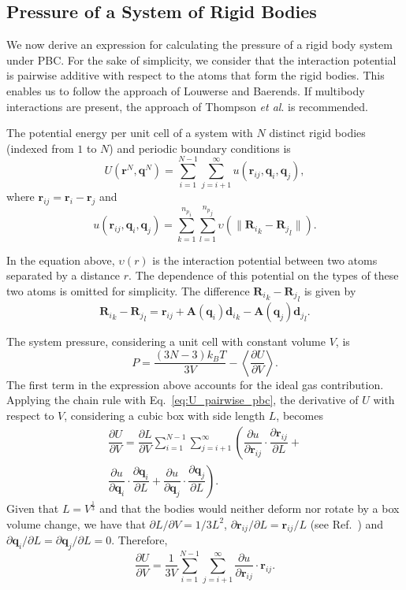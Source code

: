 \documentclass[aip,jcp,reprint,amsmath,amssymb,amsfont]{revtex4-1}
\newcommand{\mt}[1]{\boldsymbol{\mathbf{#1}}}           %
\newcommand{\vt}[1]{\boldsymbol{\mathbf{#1}}}           %
\newcommand{\diff}[2]{\dfrac{\partial #1}{\partial #2}} %
\begin{document}
\subsection{Pressure of a System of Rigid Bodies}
\label{sec:pressure}

We now derive an expression for calculating the pressure of a rigid body system under PBC. For the sake of simplicity, we consider that the interaction potential is pairwise additive with respect to the atoms that form the rigid bodies. This enables us to follow the approach of Louwerse and Baerends.\cite{Louwerse2006} If multibody interactions are present, the approach of Thompson \textit{et al}.\cite{Thompson2009} is recommended.

The potential energy per unit cell of a system with $N$ distinct rigid bodies (indexed from $1$ to $N$) and periodic boundary conditions is
\begin{equation}
\label{eq:U_pairwise_pbc}
U({\vt r}^N, {\vt q}^N) = \sum_{i=1}^{N-1} \sum_{j=i+1}^{\infty} u({\vt r}_{ij},{\vt q}_i,{\vt q}_j),
\end{equation}
where ${\vt r}_{ij} = {\vt r}_i - {\vt r}_j$ and
\begin{equation}
\label{eq:u_rigid_body_pair}
u({\vt r}_{ij},{\vt q}_i,{\vt q}_j) = \sum_{k=1}^{{n_p}_i} \sum_{l=1}^{{n_p}_j} \upsilon \left( \|{{\vt R}_i}_k - {{\vt R}_j}_l\| \right).
\end{equation}

In the equation above, $\upsilon(r)$ is the interaction potential between two atoms separated by a distance $r$. The dependence of this potential on the types of these two atoms is omitted for simplicity. The difference ${{\vt R}_i}_k - {{\vt R}_j}_l$ is given by
\[
{{\vt R}_i}_k - {{\vt R}_j}_l = {\vt r}_{ij} + {\mt A}({\vt q}_i){{\vt d}_i}_k - {\mt A}({\vt q}_j){{\vt d}_j}_l.
\]

The system pressure, considering a unit cell with constant volume $V$, is\cite{Louwerse2006,Tuckerman2010}
\[
P = \frac{(3N-3) k_B T}{3V} - \left\langle \diff{U}{V} \right\rangle.
\]
The first term in the expression above accounts for the ideal gas contribution. Applying the chain rule with Eq.~\ref{eq:U_pairwise_pbc}, the derivative of $U$ with respect to $V$, considering a cubic box with side length $L$, becomes
\begin{equation}
\begin{split}
\diff{U}{V} = \diff{L}{V} \sum_{i=1}^{N-1} \sum_{j=i+1}^{\infty} \left( \diff{u}{{\vt r}_{ij}} \cdot \diff{{\vt r}_{ij}}{L} + \right. \\ \left. \diff{u}{{\vt q}_i} \cdot \diff{{\vt q}_i}{L} + \diff{u}{{\vt q}_j} \cdot \diff{{\vt q}_j}{L}\right).
\end{split}
\end{equation}
Given that $L = V^\frac{1}{3}$ and that the bodies would neither deform nor rotate by a box volume change, we have that $\partial L / \partial V = 1/3L^2$, $\partial {\vt r}_{ij}/\partial L = {\vt r}_{ij}/L$ (see Ref.~) and $\partial {\vt q}_i / \partial L = \partial {\vt q}_j / \partial L = 0$. Therefore,
\[
\diff{U}{V} = \frac{1}{3V} \sum_{i=1}^{N-1} \sum_{j=i+1}^{\infty} \diff{u}{{\vt r}_{ij}} \cdot {\vt r}_{ij}.
\]
\end{document}
